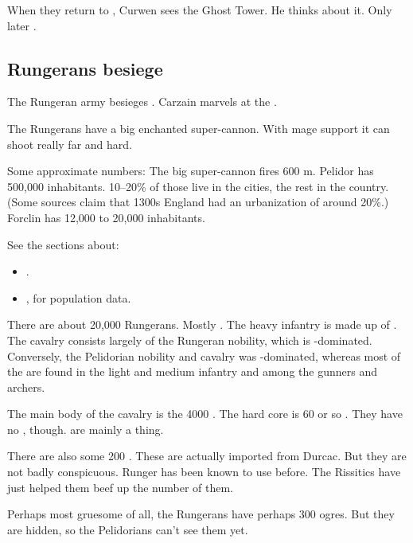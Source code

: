When they return to \Forclin, Curwen sees the Ghost Tower. 
He thinks about it.
Only later . 









\subsection{Rungerans besiege \Forclin}
The Rungeran army besieges \Forclin. 
Carzain marvels at the . 

The Rungerans have a big enchanted super-cannon. 
With mage support it can shoot really far and hard. 

Some approximate numbers:
The big super-cannon fires 600 m. 
Pelidor has 500,000 inhabitants. 
10--20\% of those live in the cities, the rest in the country.
(Some sources claim that 1300s England had an urbanization of around 20\%.)
Forclin has 12,000 to 20,000 inhabitants. 

See the sections about:
\begin{itemize}
  \item {}. 
  \item {}, for population data. 
\end{itemize}

There are about 20,000 Rungerans. 
Mostly \humans. 
The heavy infantry is made up of \scathae. 
The cavalry consists largely of the Rungeran nobility, which is \human-dominated. 
Conversely, the Pelidorian nobility and cavalry was \scatha-dominated, whereas most of the \humans are found in the light and medium infantry and among the gunners and archers. 

The main body of the cavalry is the 4000 \relcers. 
The hard core is 60 or so \murocs. 
They have no \grulcans, though. 
\Grulcans are mainly a \Galessan thing.

There are also some 200 \mezolisks. 
These are actually imported from Durcac. 
But they are not badly conspicuous. 
Runger has been known to use \mezolisks{} before. 
The Rissitics have just helped them beef up the number of them. 

Perhaps most gruesome of all, the Rungerans have perhaps 300 \nephil ogres. 
But they are hidden, so the Pelidorians can't see them yet. 

